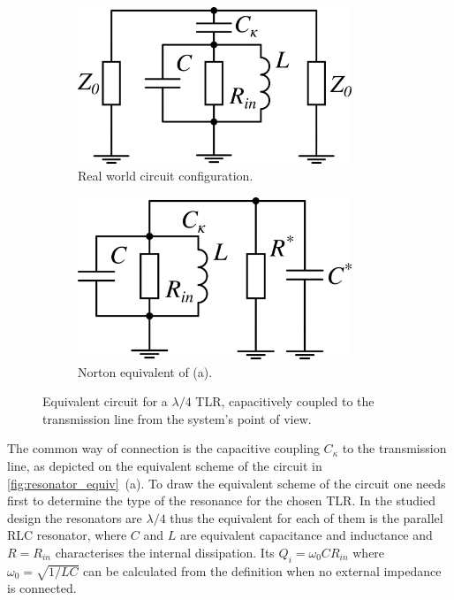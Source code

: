 \documentclass[12pt]{report}
\numberwithin{equation}{section}
\begin{document}
\begin{figure}
\captionsetup[subfigure]{width = 0.9\textwidth, justification=normal}
\centering
\begin{subfigure}[t]{0.48\textwidth}
\centering
\includegraphics[width=0.9\textwidth]{resonator}
\caption{Real world circuit configuration.}
\end{subfigure}
\begin{subfigure}[t]{0.48\textwidth}
\centering
\includegraphics[width=0.9\textwidth]{resonator_equiv}
\caption{Norton equivalent of (a).}
\end{subfigure}

\caption{Equivalent circuit for a $\lambda/4$ TLR, capacitively coupled to the transmission line from the system's point of view.}
\label{fig:resonator_equiv}
\end{figure}

The common way of connection is the capacitive coupling $C_\kappa$ to the transmission line, as depicted on the equivalent scheme of the circuit in \autoref{fig:resonator_equiv}~(a). To draw the equivalent scheme of the circuit one needs first to determine the type of the resonance for the chosen TLR\cite{pozar2012}. In the studied design the resonators are $\lambda/4$ thus the equivalent for each of them is the parallel RLC resonator, where $C$ and $L$ are equivalent capacitance and inductance and $R=R_{in}$ characterises the internal dissipation. Its $Q_i  = \omega_0	C R_{in}$ where $\omega_0 = \sqrt{1/LC}$ can be calculated from the definition when no external impedance is connected.
 
\end{document}
